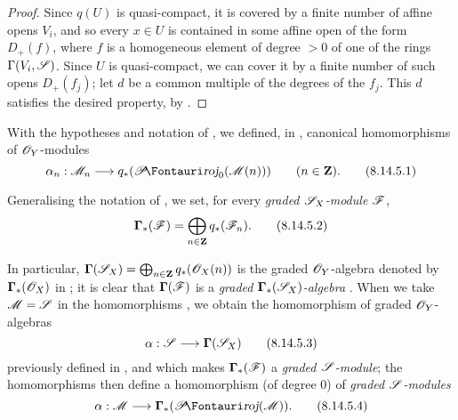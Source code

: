 \begin{proof}
\label{proof-II.8.14.4}
Since $q(U)$ is quasi-compact, it is covered by a finite number of affine opens $V_i$, and so every $x\in U$ is contained in some affine open of the form $D_+(f)$, where $f$ is a homogeneous element of degree $>0$ of one of the rings $\Gamma(V_i,\mathscr{S})$.
Since $U$ is quasi-compact, we can cover it by a finite number of such opens $D_+(f_j)$;
let $d$ be a common multiple of the degrees of the $f_j$.
This $d$ satisfies the desired property, by .
\end{proof}

\begin{env}[8.14.5]
\label{II.8.14.5}
With the hypotheses and notation of , we defined, in , canonical homomorphisms of $\mathscr{O}_Y$-modules
\[
\label{II.8.14.5.1}
    \alpha_n: \sh{M}_n \to q_*(\shProj_0(\sh{M}(n)))
    \qquad (n\in\bb{Z}).
\tag{8.14.5.1}
\]

Generalising the notation of , we set, for every \emph{graded $\mathscr{S}_X$-module $\mathscr{F}$},
\[
\label{II.8.14.5.2}
    \boldsymbol{\Gamma}_*(\mathscr{F}) = \bigoplus_{n\in\mathbf{Z}}q_*(\mathscr{F}_n).
\tag{8.14.5.2}
\]

In particular, $\boldsymbol{\Gamma}(\mathscr{S}_X)=\bigoplus_{n\in\mathbf{Z}}q_*(\mathscr{O}_X(n))$ is the graded $\mathscr{O}_Y$-algebra denoted by $\boldsymbol{\Gamma}_*(\mathscr{O}_X)$ in ;
it is clear that $\boldsymbol{\Gamma}(\mathscr{F})$ is a \emph{graded $\boldsymbol{\Gamma}_*(\mathscr{S}_X)$-algebra} .
When
we take $\mathscr{M}=\mathscr{S}$ in the homomorphisms , we obtain the homomorphism of graded $\mathscr{O}_Y$-algebras
\[
\label{II.8.14.5.3}
    \alpha:\sh{S}\to\boldsymbol{\Gamma}(\sh{S}_X)
\tag{8.14.5.3}
\]
previously defined in , and which makes $\boldsymbol{\Gamma}_*(\mathscr{F})$ a \emph{graded $\mathscr{S}$-module};
the homomorphisms  then define a homomorphism (of degree $0$) of \emph{graded $\mathscr{S}$-modules}
\[
\label{II.8.14.5.4}
    \alpha:\sh{M}\to\boldsymbol{\Gamma}_*(\shProj(\sh{M})).
\tag{8.14.5.4}
\]
\end{env}

